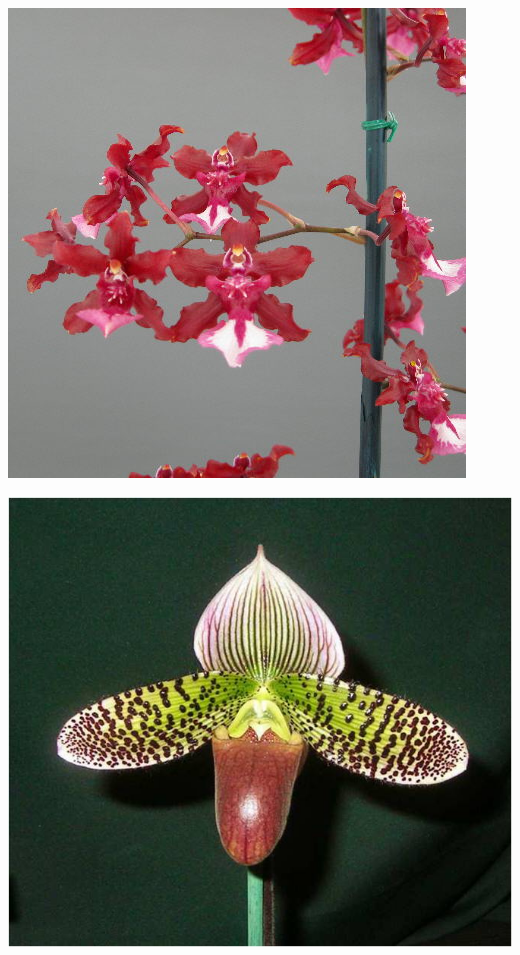 \documentclass{article}
\begin{document}
\begin{center}
\includegraphics[height=0.9\textheight, angle=90]{../Orchid_Oncidium_Red.jpg}
\end{center}
\newpage

\begin{center}
\includegraphics[height=0.9\textheight, angle=90]{../Orchid_Paphiopedilum_(Lady-Slipper).jpg}
\end{center}
\newpage
\end{document}
